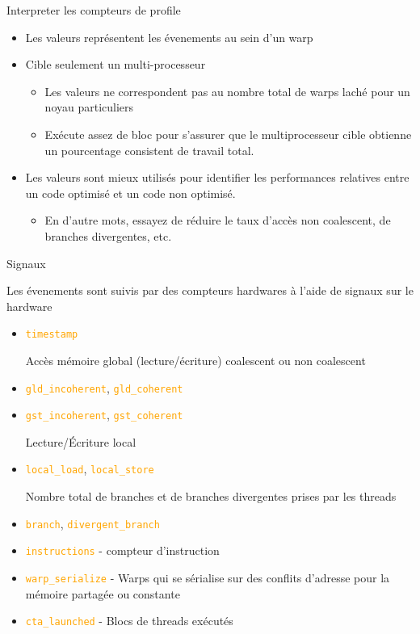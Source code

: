 \documentclass{beamer}
\begin{document}
\begin{frame}{Interpreter les compteurs de profile}

\begin{itemize}
\item Les valeurs représentent les évenements au sein d'un warp
\item Cible seulement un multi-processeur
   \begin {itemize}
   \item Les valeurs ne correspondent pas au nombre total de warps laché pour un noyau particuliers
   \item Exécute assez de bloc pour s'assurer que le multiprocesseur cible obtienne un pourcentage consistent
     de travail total.
   \end{itemize}
\item Les valeurs sont mieux utilisés pour identifier les performances relatives
  entre un code optimisé et un code non optimisé.
  \begin{itemize}
  \item En d'autre mots, essayez de réduire le taux d'accès non coalescent, de branches divergentes, etc.
  \end{itemize}
\end{itemize}
\end{frame}

\begin{frame}{Signaux}

\small
Les évenements sont suivis par des compteurs hardwares à l'aide de signaux sur le hardware
\begin{itemize}
\item \textcolor{orange}{\tt timestamp}
\begin{center}
Accès mémoire global (lecture/écriture) coalescent ou non coalescent
\end{center}
\item \textcolor{orange}{\tt gld\_incoherent}, \textcolor{orange}{\tt gld\_coherent}
\item \textcolor{orange}{\tt gst\_incoherent}, \textcolor{orange}{\tt gst\_coherent}
\begin{center}
Lecture/\'Ecriture local
\end{center}
\item \textcolor{orange}{\tt local\_load}, \textcolor{orange}{\tt local\_store}
\begin{center}
Nombre total de branches et de branches divergentes prises par les threads
\end{center}
\item \textcolor{orange}{\tt branch}, \textcolor{orange}{\tt divergent\_branch}
\item \textcolor{orange}{\tt instructions} - compteur d'instruction
\item \textcolor{orange}{\tt warp\_serialize} - Warps qui se sérialise sur des conflits d'adresse
  pour la mémoire partagée ou constante
\item \textcolor{orange}{\tt cta\_launched} - Blocs de threads exécutés
\end{itemize}
\end{frame}
\end{document}
